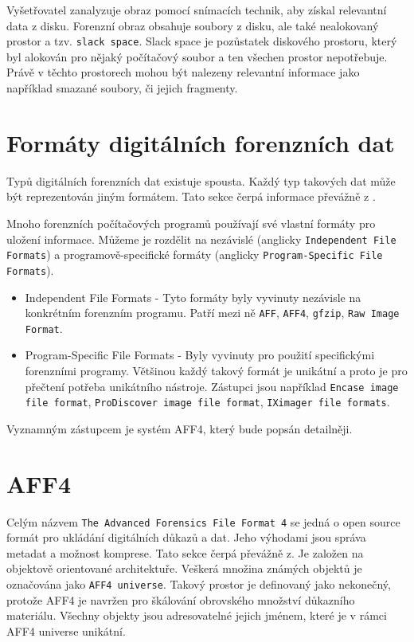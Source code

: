 Vyšetřovatel zanalyzuje obraz pomocí snímacích technik, aby získal relevantní data z disku. Forenzní obraz obsahuje soubory z disku, ale také nealokovaný prostor a tzv. \texttt{slack space}. Slack space je pozůstatek diskového prostoru, který byl alokován pro nějaký počítačový soubor a ten všechen prostor nepotřebuje. Právě v těchto prostorech mohou být nalezeny relevantní informace jako například smazané soubory, či jejich fragmenty. \cite{forensicImages}

\section{Formáty digitálních forenzních dat}
Typů digitálních forenzních dat existuje spousta. Každý typ takových dat může být reprezentován jiným formátem. Tato sekce čerpá informace převážně z \cite{forensicswikiForensicFF}.

Mnoho forenzních počítačových programů používají své vlastní formáty pro uložení informace. Můžeme je rozdělit na nezávislé (anglicky \texttt{Independent File Formats}) a programově-specifické formáty (anglicky \texttt{Program-Specific File Formats}).

\begin{itemize}
\item Independent File Formats - Tyto formáty byly vyvinuty nezávisle na konkrétním forenzním programu. Patří mezi ně \texttt{AFF}, \texttt{AFF4}, \texttt{gfzip}, \texttt{Raw Image Format}.

\item Program-Specific File Formats - Byly vyvinuty pro použití specifickými forenzními programy. Většinou každý takový formát je unikátní a proto je pro přečtení potřeba unikátního nástroje.
Zástupci jsou například \texttt{Encase image file format}, \texttt{ProDiscover image file format}, \texttt{IXimager file formats}.
\end{itemize}

\noindent Vyznamným zástupcem je systém AFF4, který bude popsán detailněji.

\section{AFF4}
Celým názvem \texttt{The Advanced Forensics File Format 4} se jedná o open source formát pro ukládání digitálních důkazů a dat. Jeho výhodami jsou správa metadat a možnost komprese. Tato sekce čerpá převážně z\cite{aff4}. Je založen na objektově orientované architektuře. Veškerá množina známých objektů je označována jako \texttt{AFF4 universe}. Takový prostor je definovaný jako nekonečný, protože AFF4 je navržen pro škálování obrovského množství důkazního materiálu. Všechny objekty jsou adresovatelné jejich jménem, které je v rámci AFF4 universe unikátní.

